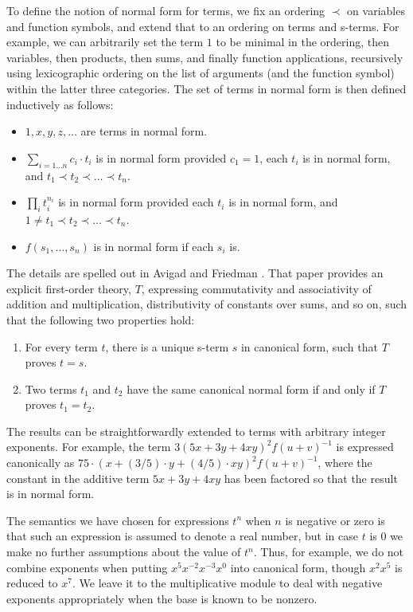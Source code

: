 \documentclass[runningheds]{llncs}
\begin{document}
To define the notion of normal form for terms, we fix an ordering $\prec$ on variables and function symbols, and extend that to an ordering on terms and s-terms. For example, we can arbitrarily set the term $1$ to be minimal in the ordering, then variables, then products, then sums, and finally function applications, recursively using lexicographic ordering on the list of arguments (and the function symbol) within the latter three categories. The set of terms in normal form is then defined inductively as follows:
\begin{itemize}
 \item $1, x, y, z, \ldots$ are terms in normal form.
 \item $\sum_{i=1\ldots n} c_i \cdot t_i$ is in normal form provided $c_1 = 1$, each $t_i$ is in normal form, and $t_1 \prec t_2 \prec \ldots \prec t_n$.
 \item $\prod_i t_i^{n_i}$ is in normal form provided each $t_i$ is in normal form, and $1 \neq t_1 \prec t_2 \prec \ldots \prec t_n$.
 \item $f(s_1,\ldots, s_n)$ is in normal form if each $s_i$ is.
\end{itemize}
The details are spelled out in Avigad and Friedman \cite{avigad:friedman:06}. That paper provides an explicit first-order theory, $T$, expressing commutativity and associativity of addition and multiplication, distributivity of constants over sums, and so on, such that the following two properties hold:
\begin{enumerate}
 \item For every term $t$, there is a unique s-term $s$ in canonical form, such that $T$ proves $t = s$.
 \item Two terms $t_1$ and $t_2$ have the same canonical normal form if and only if $T$ proves $t_1 = t_2$.
\end{enumerate}
The results can be straightforwardly extended to terms with arbitrary integer exponents. For example, the term $3 (5x + 3y + 4 x y)^2 f(u + v)^{-1}$ is expressed canonically as $75 \cdot (x + (3/5) \cdot y + (4/5) \cdot x y)^2 f(u + v)^{-1}$, where the constant in the additive term $5x + 3y + 4 x y$ has been factored so that the result is in normal form. 

The semantics we have chosen for expressions $t^n$ when $n$ is negative or zero is that such an expression is assumed to denote a real number, but in case $t$ is $0$ we make no further assumptions about the value of $t^n$. Thus, for example, we do not combine exponents when putting $x^5 x^{-2} x^{-3} x^0$ into canonical form, though $x^2 x^5$ is reduced to $x^7$. We leave it to the multiplicative module to deal with negative exponents appropriately when the base is known to be nonzero.
\end{document}
